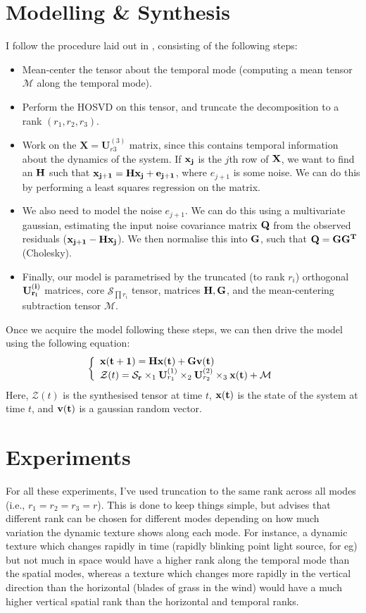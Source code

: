 \documentclass{article}
\begin{document}
\section{Modelling \& Synthesis}
I follow the procedure laid out in \cite{synthesis}, consisting of the following steps:
\begin{itemize}
	\item Mean-center the tensor about the temporal mode (computing a mean tensor $\mathcal{M}$ along the temporal mode).
	\item Perform the HOSVD on this tensor, and truncate the decomposition to a rank $(r_1, r_2, r_3)$.
	\item Work on the $\mathbf{X} = \mathbf{U}^{(3)}_{r3}$ matrix, since this contains temporal information about the dynamics of the system. If $\bf x_j$ is the $j$th row of $\bf X$, we want to find an $\bf H$ such that $\bf x_{j+1} = \bf H \bf x_j + e_{j+1}$, where $e_{j+1}$ is some noise. We can do this by performing a least squares regression on the matrix.
	\item We also need to model the noise $e_{j+1}$. We can do this using a multivariate gaussian, estimating the input noise covariance matrix $\bf Q$ from the observed residuals ($\bf x_{j+1} - H x_j$). We then normalise this into $\bf G$, such that $\bf Q = \bf G \bf G^T$ (Cholesky).
	\item Finally, our model is parametrised by the truncated (to rank $r_i$) orthogonal $\bf U^{(i)}_{r_i}$ matrices, core $\mathcal{S}_{\prod r_i}$ tensor, matrices $\bf H, G$, and the mean-centering subtraction tensor $\mathcal{M}$.
\end{itemize}
Once we acquire the model following these steps, we can then drive the model using the following equation:
\begin{equation}
	\left\{ 
	\begin{array}{l}
		\bf x(t + 1) = Hx(t) + Gv(t)\\
		\mathcal{Z}(t) = \mathcal{S}_{\bf r} \times_1  {\bf U}^{(1)}_{r_1} \times_2 {\bf U}^{(2)}_{r_2} \times_3 \bf x(t) + \mathcal{M}
	\end{array} 
	\right.
\end{equation} 
Here, $\mathcal{Z}(t)$ is the synthesised tensor at time $t$, $\bf x(t)$ is the state of the system at time $t$, and $\bf v(t)$ is a gaussian random vector. 

\section{Experiments}
For all these experiments, I've used truncation to the same rank across all modes (i.e., $r_1 = r_2 = r_3 = r$). This is done to keep things simple, but \cite{synthesis} advises that different rank can be chosen for different modes depending on how much variation the dynamic texture shows along each mode. For instance, a dynamic texture which changes rapidly in time (rapidly blinking point light source, for eg) but not much in space would have a higher rank along the temporal mode than the spatial modes, whereas a texture which changes more rapidly in the vertical direction than the horizontal (blades of grass in the wind) would have a much higher vertical spatial rank than the horizontal and temporal ranks.\bigskip
\end{document}
